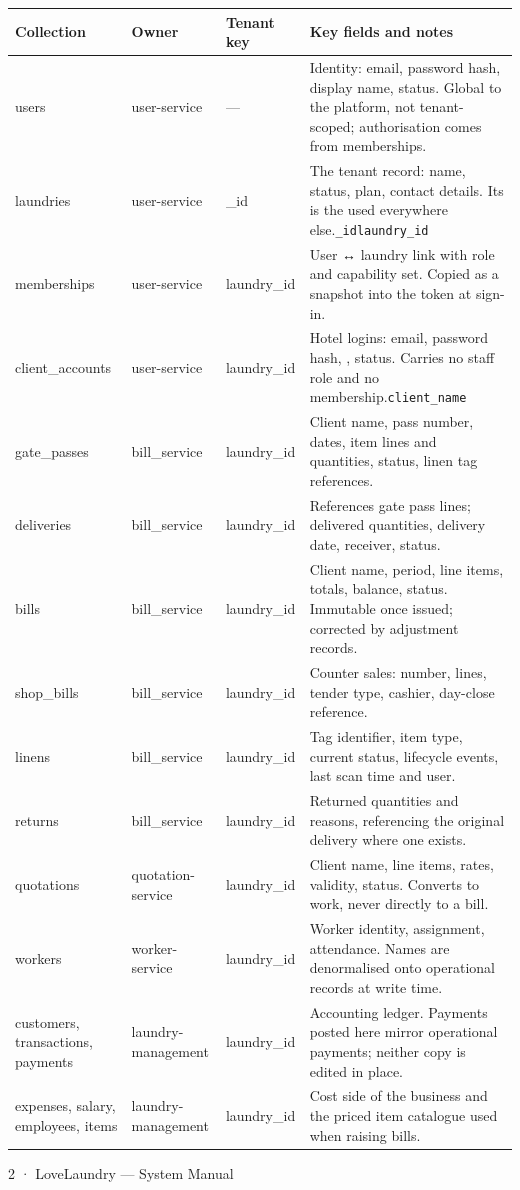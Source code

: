\documentclass[11pt,a4paper,oneside]{book}
\begin{document}
\begin{center}\small
\begin{tabularx}{\linewidth}{|X|X|X|X|}
\hline
\rowcolor{lightgrey}
\textbf{Collection} & \textbf{Owner} & \textbf{Tenant key} & \textbf{Key fields and notes} \\ \hline
users & user-service & — & Identity: email, password hash, display name, status. Global to the platform, not tenant-scoped; authorisation comes from memberships. \\ \hline
laundries & user-service & \_id & The tenant record: name, status, plan, contact details. Its  is the  used everywhere else.\texttt{\_id}\texttt{laundry\_id} \\ \hline
memberships & user-service & laundry\_id & User ↔ laundry link with role and capability set. Copied as a snapshot into the token at sign-in. \\ \hline
client\_accounts & user-service & laundry\_id & Hotel logins: email, password hash, , status. Carries no staff role and no membership.\texttt{client\_name} \\ \hline
gate\_passes & bill\_service & laundry\_id & Client name, pass number, dates, item lines and quantities, status, linen tag references. \\ \hline
deliveries & bill\_service & laundry\_id & References gate pass lines; delivered quantities, delivery date, receiver, status. \\ \hline
bills & bill\_service & laundry\_id & Client name, period, line items, totals, balance, status. Immutable once issued; corrected by adjustment records. \\ \hline
shop\_bills & bill\_service & laundry\_id & Counter sales: number, lines, tender type, cashier, day-close reference. \\ \hline
linens & bill\_service & laundry\_id & Tag identifier, item type, current status, lifecycle events, last scan time and user. \\ \hline
returns & bill\_service & laundry\_id & Returned quantities and reasons, referencing the original delivery where one exists. \\ \hline
quotations & quotation-service & laundry\_id & Client name, line items, rates, validity, status. Converts to work, never directly to a bill. \\ \hline
workers & worker-service & laundry\_id & Worker identity, assignment, attendance. Names are denormalised onto operational records at write time. \\ \hline
customers, transactions, payments & laundry-management & laundry\_id & Accounting ledger. Payments posted here mirror operational payments; neither copy is edited in place. \\ \hline
expenses, salary, employees, items & laundry-management & laundry\_id & Cost side of the business and the priced item catalogue used when raising bills. \\ \hline
\end{tabularx}
\end{center}
2 · LoveLaundry — System Manual
\end{document}
